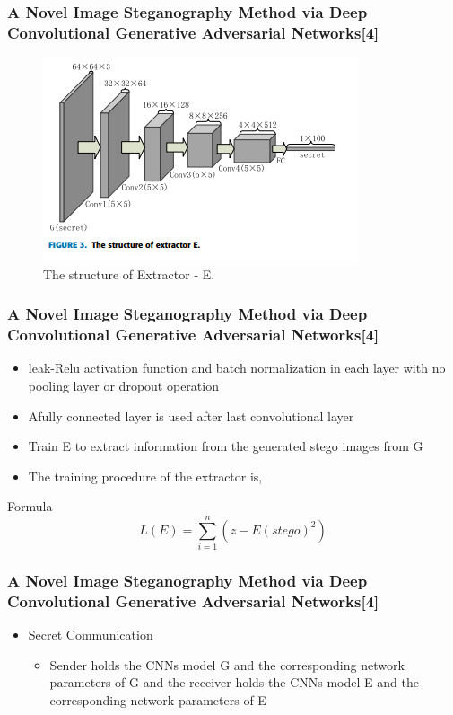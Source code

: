 \documentclass{beamer} %
\theoremstyle{definition} %
\begin{document}
\begin{frame}
\frametitle{A Novel Image Steganography Method via Deep Convolutional Generative Adversarial Networks[4]  }
\begin{figure}
	\includegraphics[scale=0.55]{extractorgan.png}
	\caption{The structure of Extractor - E. }
\end{figure}
\end{frame}

\begin{frame}
\frametitle{A Novel Image Steganography Method via Deep Convolutional Generative Adversarial Networks[4] }
\begin{itemize}
    \item  leak-Relu activation function and batch normalization in each layer with no pooling layer or dropout operation   
    \item Afully connected layer is used after last convolutional layer  
    \item Train E to extract information from the generated stego images from G   \item The training procedure of the extractor is,
\end{itemize}
\begin{block}{Formula}
	\begin{equation}
	L(E) = \sum_{i=1}^{n} (z - E(stego)^2)
	\end{equation}
\end{block}
\end{frame}

\begin{frame}
\frametitle{A Novel Image Steganography Method via Deep Convolutional Generative Adversarial Networks[4]  }
\begin{itemize}
	\item  Secret Communication 
	\begin{itemize}
		\item Sender holds the CNNs model G and the corresponding network parameters of G and the receiver holds the CNNs model E and the corresponding network parameters of E 
	\end{itemize}
\end{itemize}
\end{frame}
\end{document}
